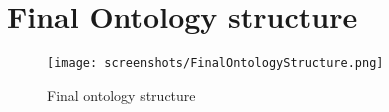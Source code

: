 \chapter{Final Ontology structure}
\label{app:finalOntology}

\begin{figure}[h]
    \centering
    \captionsetup{justification=centering}
    \texttt{[image: screenshots/FinalOntologyStructure.png]}
    \caption{Final ontology structure}
    \label{fig:final_ontology_structure}
\end{figure}

